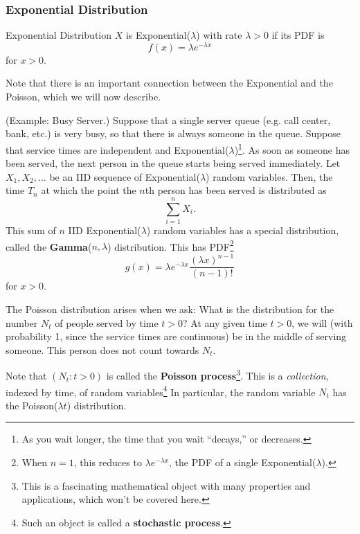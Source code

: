 \documentclass[letterpaper]{article}
\begin{document}
\subsubsection{Exponential Distribution}
\begin{definition}{Exponential Distribution}{}
    $X$ is Exponential($\lambda$) with rate $\lambda > 0$ if its PDF is 
    \[f(x) = \lambda e^{-\lambda x}\]
    for $x > 0$. 
\end{definition}
Note that there is an important connection between the Exponential and the Poisson, which we will now describe. 
\begin{mdframed}[]
    (Example: Busy Server.) Suppose that a single server queue (e.g. call center, bank, etc.) is very busy, so that there is always someone in the queue. Suppose that service times are independent and Exponential($\lambda$)\footnote{As you wait longer, the time that you wait ``decays,'' or decreases.}. As soon as someone has been served, the next person in the queue starts being served immediately. Let $X_1, X_2, \dots$ be an IID sequence of Exponential($\lambda$) random variables. Then, the time $T_n$ at which the point the $n$th person has been served is distributed as \[\sum_{i = 1}^{n} X_i.\] This sum of $n$ IID Exponential($\lambda$) random variables has a special distribution, called the \textbf{Gamma}($n, \lambda$) distribution. This has PDF\footnote{When $n = 1$, this reduces to $\lambda e^{-\lambda x}$, the PDF of a single Exponential($\lambda$).} 
    \[g(x) = \lambda e^{-\lambda x} \frac{(\lambda x)^{n - 1}}{(n - 1)!}\]
    for $x > 0$.
\end{mdframed}
The Poisson distribution arises when we ask: What is the distribution for the number $N_t$ of people served by time $t > 0$? At any given time $t > 0$, we will (with probability 1, since the service times are continuous) be in the middle of serving someone. This person does not count towards $N_t$. 

\bigskip 

Note that $(N_t : t > 0)$ is called the \textbf{Poisson process}\footnote{This is a fascinating mathematical object with many properties and applications, which won't be covered here.}. This is a \emph{collection}, indexed by time, of random variables\footnote{Such an object is called a \textbf{stochastic process}.} In particular, the random variable $N_t$ has the Poisson($\lambda t$) distribution.
\end{document}
